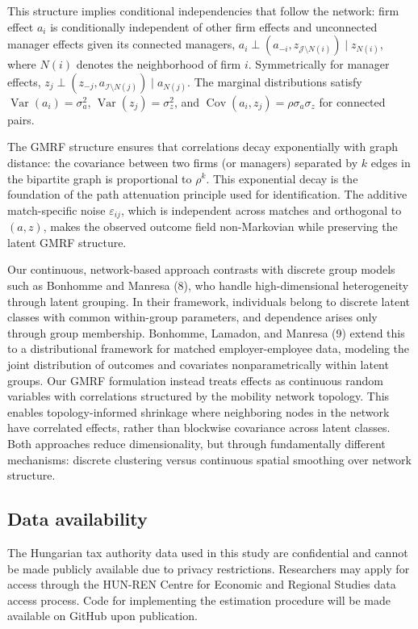 \documentclass[9pt,twocolumn,twoside]{pnas-new}
\begin{document}
{This structure implies conditional independencies that follow the network: firm effect $a_i$ is conditionally independent of other firm effects and unconnected manager effects given its connected managers, $a_i \perp (a_{-i}, z_{\mathcal{J}\setminus N(i)}) \mid z_{N(i)}$, where $N(i)$ denotes the neighborhood of firm $i$. Symmetrically for manager effects, $z_j \perp (z_{-j}, a_{\mathcal{I}\setminus N(j)}) \mid a_{N(j)}$. The marginal distributions satisfy $\operatorname{Var}(a_i)=\sigma_a^2$, $\operatorname{Var}(z_j)=\sigma_z^2$, and $\operatorname{Cov}(a_i,z_j)=\rho\sigma_a\sigma_z$ for connected pairs.

The GMRF structure ensures that correlations decay exponentially with graph distance: the covariance between two firms (or managers) separated by $k$ edges in the bipartite graph is proportional to $\rho^k$. This exponential decay is the foundation of the path attenuation principle used for identification. The additive match-specific noise $\varepsilon_{ij}$, which is independent across matches and orthogonal to $(a,z)$, makes the observed outcome field non-Markovian while preserving the latent GMRF structure.

Our continuous, network-based approach contrasts with discrete group models such as Bonhomme and Manresa (8), who handle high-dimensional heterogeneity through latent grouping. In their framework, individuals belong to discrete latent classes with common within-group parameters, and dependence arises only through group membership. Bonhomme, Lamadon, and Manresa (9) extend this to a distributional framework for matched employer-employee data, modeling the joint distribution of outcomes and covariates nonparametrically within latent groups. Our GMRF formulation instead treats effects as continuous random variables with correlations structured by the mobility network topology. This enables topology-informed shrinkage where neighboring nodes in the network have correlated effects, rather than blockwise covariance across latent classes. Both approaches reduce dimensionality, but through fundamentally different mechanisms: discrete clustering versus continuous spatial smoothing over network structure.


\subsection*{Data availability}

The Hungarian tax authority data used in this study are confidential and cannot be made publicly available due to privacy restrictions. Researchers may apply for access through the HUN-REN Centre for Economic and Regional Studies data access process. Code for implementing the estimation procedure will be made available on GitHub upon publication.

}
\end{document}
